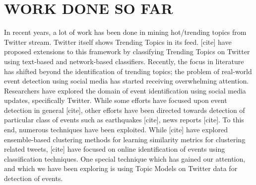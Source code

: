 \section{\uppercase{Work Done So Far}}
In recent years, a lot of work has been done in mining hot/trending topics from Twitter stream. Twitter itself shows Trending Topics in its feed. [cite] have proposed extensions to this framework by classifying Trending Topics on Twitter using text-based and network-based classifiers. Recently, the focus in literature has shifted beyond the identification of trending topics; the problem of real-world event detection using social media has started receiving overwhelming attention. Researchers have explored the domain of event identification using social media updates, specifically Twitter. While some efforts have focused upon event detection in general [cite], other efforts have been directed towards detection of particular class of events such as earthquakes [cite], news reports [cite]. To this end, numerous techniques have been exploited. While [cite] have explored ensemble-based clustering methods for learning similarity metrics for clustering related tweets, [cite] have focused on online identification of events using classification techniques. One special technique which has gained our attention, and which we have been exploring is using Topic Models on Twitter data for detection of events. 

